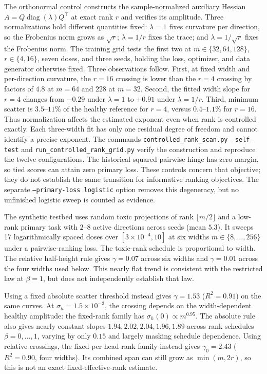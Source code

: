 \documentclass{article}
\begin{document}
The orthonormal control constructs the sample-normalized auxiliary Hessian $A=Q\operatorname{diag}(\lambda)Q^\top$ at exact rank $r$ and verifies its amplitude. Three normalizations hold different quantities fixed: $\lambda=1$ fixes curvature per direction, so the Frobenius norm grows as $\sqrt r$; $\lambda=1/r$ fixes the trace; and $\lambda=1/\sqrt r$ fixes the Frobenius norm. The training grid tests the first two at $m\in\{32,64,128\}$, $r\in\{4,16\}$, seven doses, and three seeds, holding the loss, optimizer, and data generator otherwise fixed. Three observations follow. First, at fixed width and per-direction curvature, the $r=16$ crossing is lower than the $r=4$ crossing by factors of $4.8$ at $m=64$ and $228$ at $m=32$. Second, the fitted width slope for $r=4$ changes from $-0.29$ under $\lambda=1$ to $+0.91$ under $\lambda=1/r$. Third, minimum scatter is $3.5$--$11\%$ of the healthy reference for $r=4$, versus $0.4$--$1.1\%$ for $r=16$. Thus normalization affects the estimated exponent even when rank is controlled exactly. Each three-width fit has only one residual degree of freedom and cannot identify a precise exponent. The commands \texttt{controlled\_rank\_scan.py --self-test} and \texttt{run\_controlled\_rank\_grid.py} verify the construction and reproduce the twelve configurations. The historical squared pairwise hinge has zero margin, so tied scores can attain zero primary loss. These controls concern that objective; they do not establish the same transition for informative ranking objectives. The separate \texttt{--primary-loss logistic} option removes this degeneracy, but no unfinished logistic sweep is counted as evidence.


The synthetic testbed uses random toxic projections of rank $\lfloor m/2\rfloor$ and a low-rank primary task with $2$--$8$ active directions across seeds (mean $5.3$). It sweeps 17 logarithmically spaced doses over $[3\times10^{-4},10]$ at six widths $m\in\{8,\dots,256\}$ under a pairwise-ranking loss. The toxic-rank schedule is proportional to width. The relative half-height rule gives $\gamma=0.07$ across six widths and $\gamma=0.01$ across the four widths used below. This nearly flat trend is consistent with the restricted law at $\beta=1$, but does not independently establish that law.

Using a fixed absolute scatter threshold instead gives $\gamma=1.53$ ($R^2=0.91$) on the same curves. At $\sigma_h=1.5\times10^{-3}$, the crossing depends on the width-dependent healthy amplitude: the fixed-rank family has $\sigma_h(0)\propto m^{0.95}$. The absolute rule also gives nearly constant slopes $1.94,2.02,2.04,1.96,1.89$ across rank schedules $\beta=0,\dots,1$, varying by only $0.15$ and largely masking schedule dependence. Using relative crossings, the fixed-per-head-rank family instead gives $\gamma_0=2.43$ ($R^2=0.90$, four widths). Its combined span can still grow as $\min(m,2r)$, so this is not an exact fixed-effective-rank estimate.
\end{document}
